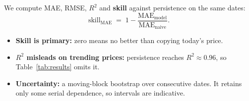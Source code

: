 We compute MAE, RMSE, $R^2$ and \textbf{skill} against persistence on the same
dates:
\begin{equation*}
  \text{skill}_{\text{MAE}} \;=\; 1 - \frac{\text{MAE}_{\text{model}}}{\text{MAE}_{\text{naive}}}.
\end{equation*}
\begin{itemize}
  \item \textbf{Skill is primary:} zero means no better than copying today's price.
  \item \textbf{$R^2$ misleads on trending prices:} persistence reaches
  $R^2 \approx 0.96$, so Table~\ref{tab:results} omits it.
  \item \textbf{Uncertainty:} a moving-block bootstrap over consecutive dates. It
  retains only some serial dependence, so intervals are indicative.
\end{itemize}
